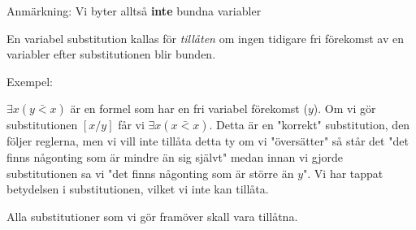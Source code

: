 \par\bigskip
\noindent Anmärkning: Vi byter alltså \textbf{inte} bundna variabler
\par\bigskip
\noindent En variabel substitution kallas för \textit{tillåten} om ingen tidigare fri förekomst av en variabler efter substitutionen blir bunden.
\par\bigskip
\noindent Exempel:\par
\noindent $\exists x(y\bar{<}x)$ är en formel som har en fri variabel förekomst ($y$). Om vi gör substitutionen $[x/y]$ får vi $\exists x(x\bar{<}x)$. Detta är en "korrekt" substitution, den följer reglerna, men vi vill inte tillåta detta ty om vi "översätter" så står det "det finns någonting som är mindre än sig självt" medan innan vi gjorde substitutionen sa vi "det finns någonting som är större än $y$". Vi har tappat betydelsen i substitutionen, vilket vi inte kan tillåta.
\par
\noindent Alla substitutioner som vi gör framöver skall vara tillåtna.

